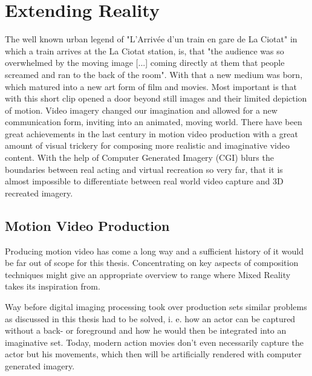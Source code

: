 %
\chapter{Extending Reality}
\label{sec:extendingreality}


The well known urban legend of "L'Arriv\'ee d'un train en gare de La Ciotat" in 
which a train arrives at the La Ciotat station, is, that "the audience was so 
overwhelmed by the moving image [...] coming directly at them that people 
screamed and ran to the back of the room". \cite{wiki:train:2017} With that a 
new medium was born, which matured into a new art form of film and movies.
\newline
Most important is that with this short clip opened a door beyond still images 
and their limited depiction of motion. Video imagery changed our imagination 
and allowed for a new communication form, inviting into an animated, moving 
world. There have been great achievements in the last century in motion video 
production with a great amount of visual trickery for composing more realistic 
and imaginative video content. With the help of Computer Generated Imagery 
(CGI) blurs the boundaries between real acting and virtual recreation so very 
far, that it is almost impossible to differentiate between real world video 
capture and 3D recreated imagery.

\section{Motion Video Production}

Producing motion video has come a long way and a sufficient history of it would 
be far out of scope for this thesis. Concentrating on key aspects of 
composition techniques might give an appropriate overview to range where Mixed 
Reality takes its inspiration from.

Way before digital imaging processing took over production sets similar 
problems as discussed in this thesis had to be solved, i. e. how an actor can 
be captured without a back- or foreground and how he would then be integrated 
into an imaginative set. Today, modern action movies don't even necessarily 
capture the actor but his movements, which then will be artificially rendered 
with computer generated imagery.

